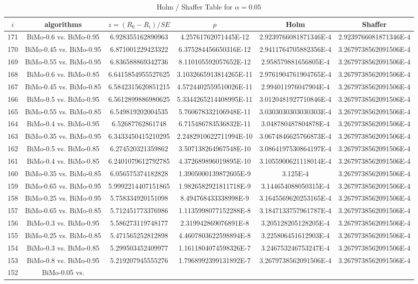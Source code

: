 \documentclass[a4paper,10pt]{article}
\begin{document}
\begin{landscape}
\begin{table}[!htp]
\centering\tiny
\caption{Holm / Shaffer Table for $\alpha=0.05$}
\begin{tabular}{cccccc}
$i$&algorithms&$z=(R_0 - R_i)/SE$&$p$&Holm&Shaffer\\
\hline
171&BiMo-0.6 vs. BiMo-0.95&6.928355162890963&4.25761762071445E-12&2.9239766081871346E-4&2.9239766081871346E-4\\170&BiMo-0.45 vs. BiMo-0.95&6.871001229423322&6.375284456650316E-12&2.9411764705882356E-4&3.2679738562091506E-4\\169&BiMo-0.55 vs. BiMo-0.95&6.836588869342736&8.110105592057652E-12&2.958579881656805E-4&3.2679738562091506E-4\\168&BiMo-0.6 vs. BiMo-0.85&6.6415854955527625&3.1032665913814265E-11&2.9761904761904765E-4&3.2679738562091506E-4\\167&BiMo-0.45 vs. BiMo-0.85&6.5842315620851215&4.5724402559510026E-11&2.994011976047904E-4&3.2679738562091506E-4\\166&BiMo-0.5 vs. BiMo-0.95&6.5612899886980625&5.3344265214408995E-11&3.0120481927710846E-4&3.2679738562091506E-4\\165&BiMo-0.55 vs. BiMo-0.85&6.549819202004535&5.760678332106948E-11&3.0303030303030303E-4&3.2679738562091506E-4\\164&BiMo-0.4 vs. BiMo-0.95&6.52687762861748&6.715486783536832E-11&3.048780487804878E-4&3.2679738562091506E-4\\163&BiMo-0.35 vs. BiMo-0.95&6.3433450415210295&2.2482910622711994E-10&3.0674846625766873E-4&3.2679738562091506E-4\\162&BiMo-0.5 vs. BiMo-0.85&6.274520321359862&3.507138264967548E-10&3.0864197530864197E-4&3.2679738562091506E-4\\161&BiMo-0.4 vs. BiMo-0.85&6.2401079612792785&4.372689896019895E-10&3.1055900621118014E-4&3.2679738562091506E-4\\160&BiMo-0.35 vs. BiMo-0.85&6.056575374182828&1.3905000139872605E-9&3.125E-4&3.2679738562091506E-4\\159&BiMo-0.65 vs. BiMo-0.95&5.9992214407151865&1.9826582921811718E-9&3.144654088050315E-4&3.2679738562091506E-4\\158&BiMo-0.25 vs. BiMo-0.95&5.758334920151098&8.494768433338998E-9&3.1645569620253165E-4&3.2679738562091506E-4\\157&BiMo-0.65 vs. BiMo-0.85&5.712451773376986&1.1135998077152288E-8&3.1847133757961787E-4&3.2679738562091506E-4\\156&BiMo-0.3 vs. BiMo-0.95&5.586273119748177&2.319942869076891E-8&3.205128205128205E-4&3.2679738562091506E-4\\155&BiMo-0.25 vs. BiMo-0.85&5.471565252812898&4.4607803622598894E-8&3.225806451612903E-4&3.2679738562091506E-4\\154&BiMo-0.3 vs. BiMo-0.85&5.299503452409977&1.1611804074598326E-7&3.246753246753247E-4&3.2679738562091506E-4\\153&BiMo-0.8 vs. BiMo-0.95&5.219207945555276&1.7968992399131892E-7&3.2679738562091506E-4&3.2679738562091506E-4\\152&BiMo-0.05 vs. 
\end{tabular}
\end{table}
\end{landscape}
\end{document}
